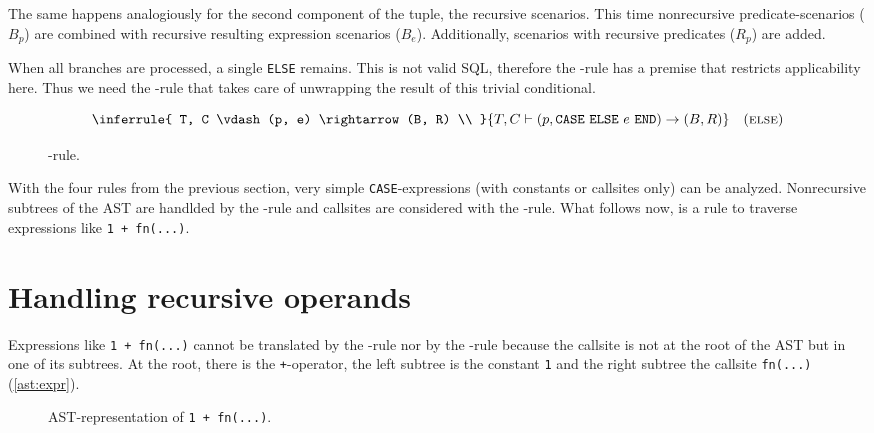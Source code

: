 The same happens analogiously for the second component of the tuple, the recursive scenarios. This time nonrecursive predicate-scenarios ($B_p$) are combined with recursive resulting expression scenarios ($B_e$). Additionally, scenarios with recursive predicates ($R_p$) are added.

When all branches are processed, a single \texttt{ELSE} remains. This is not valid SQL, therefore the \RBASE-rule has a premise that restricts applicability here. Thus we need the \RELSE-rule that takes care of unwrapping the result of this trivial conditional.
\begin{figure}[h!]
    \centering\small
$$\inferrule{
    T, C \vdash (p, e) \rightarrow (B, R) \\
}{
    T, C \vdash (p, \CASE ~\ELSE ~e~ \END) \rightarrow (B, R)
}
\quad(\textsc{else})$$
    \caption{\RELSE-rule.}
    \label{fig:my_label}
\end{figure}

With the four rules from the previous section, very simple \texttt{CASE}-expressions (with constants or callsites only) can be analyzed. Nonrecursive subtrees of the AST are handlded by the \RBASE-rule and callsites are considered with the \RREC-rule. What follows now, is a rule to traverse expressions like \texttt{1 + fn(...)}.

\section{Handling recursive operands}

Expressions like \texttt{1 + fn(...)} cannot be translated by the \RBASE-rule nor by the \RREC-rule because the callsite is not at the root of the AST but in one of its subtrees. At the root, there is the \texttt{+}-operator, the left subtree is the constant \texttt{1} and the right subtree the callsite \texttt{fn(...)} (\autoref{ast:expr}).

\begin{wrapfigure}{r}{.3\textwidth}
  \centering
  \caption{AST-representation of \texttt{1 + fn(...)}.}
  \label{ast:expr}
\end{wrapfigure}

